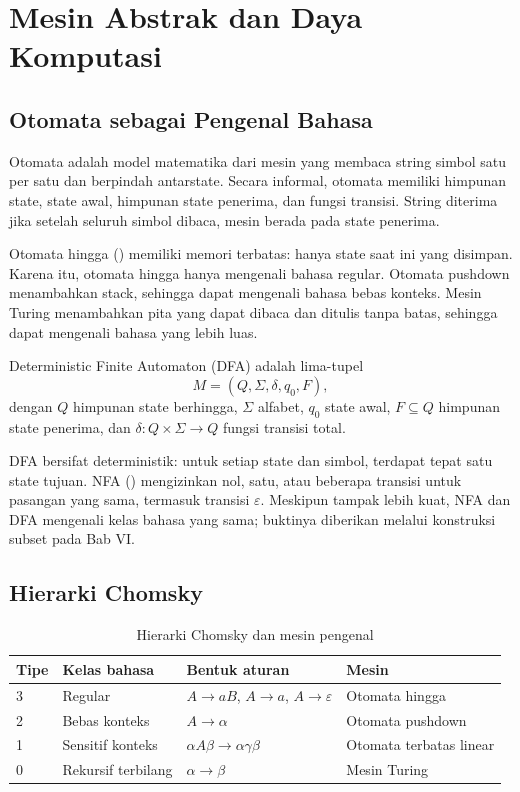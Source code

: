 \section{Mesin Abstrak dan Daya Komputasi}
\label{sec:ch02-mesin}

\subsection{Otomata sebagai Pengenal Bahasa}

Otomata adalah model matematika dari mesin yang membaca string simbol
satu per satu dan berpindah antarstate. Secara informal, otomata
memiliki himpunan state, state awal, himpunan state penerima, dan
fungsi transisi. String diterima jika setelah seluruh simbol dibaca,
mesin berada pada state penerima.

Otomata hingga () memiliki memori terbatas:
hanya state saat ini yang disimpan. Karena itu, otomata hingga hanya
mengenali bahasa regular. Otomata pushdown menambahkan stack, sehingga
dapat mengenali bahasa bebas konteks. Mesin Turing menambahkan pita
yang dapat dibaca dan ditulis tanpa batas, sehingga dapat mengenali
bahasa yang lebih luas.

\begin{definisi}[DFA]
Deterministic Finite Automaton (DFA) adalah lima-tupel
\[
M = (Q, \Sigma, \delta, q_0, F),
\]
dengan \(Q\) himpunan state berhingga, \(\Sigma\) alfabet, \(q_0\)
state awal, \(F \subseteq Q\) himpunan state penerima, dan
\(\delta : Q \times \Sigma \to Q\) fungsi transisi total.
\end{definisi}

DFA bersifat deterministik: untuk setiap state dan simbol, terdapat
tepat satu state tujuan. NFA ()
mengizinkan nol, satu, atau beberapa transisi untuk pasangan yang sama,
termasuk transisi \(\varepsilon\). Meskipun tampak lebih kuat, NFA dan
DFA mengenali kelas bahasa yang sama; buktinya diberikan melalui
konstruksi subset pada Bab VI.

\subsection{Hierarki Chomsky}

\begin{table}[H]
\centering
\caption{Hierarki Chomsky dan mesin pengenal}
\label{tab:ch02-chomsky}
\begin{tabularx}{\textwidth}{@{}l l X l@{}}
\toprule
\textbf{Tipe} & \textbf{Kelas bahasa} & \textbf{Bentuk aturan} &
\textbf{Mesin} \\
\midrule
3 & Regular & \(A \to aB\), \(A \to a\), \(A \to \varepsilon\) &
Otomata hingga \\
2 & Bebas konteks & \(A \to \alpha\) & Otomata pushdown \\
1 & Sensitif konteks & \(\alpha A \beta \to \alpha \gamma \beta\) &
Otomata terbatas linear \\
0 & Rekursif terbilang & \(\alpha \to \beta\) & Mesin Turing \\
\bottomrule
\end{tabularx}
\end{table}

